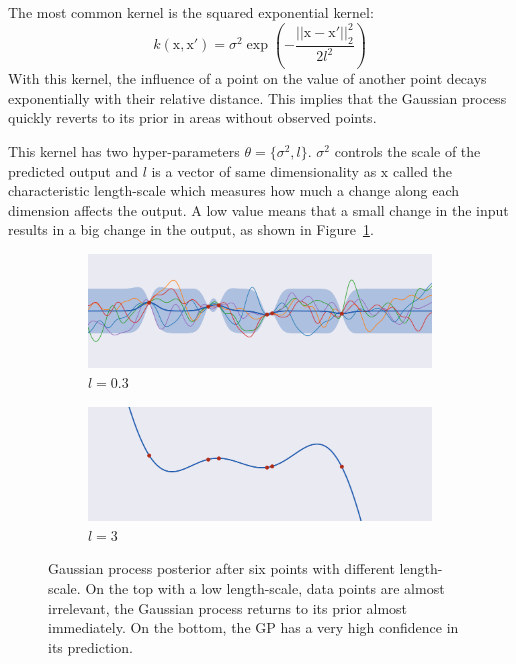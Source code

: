 The most common kernel is the squared exponential kernel:
\begin{equation}
	k(\mathrm{x}, \mathrm{x'}) = \sigma^2 \exp\left( -\frac{||\mathrm{x} - \mathrm{x'}||_2^2}{2l^2}\right)
	\label{eq:sqexp}
\end{equation}
With this kernel, the influence of a point on the value of another point decays exponentially with their relative distance. This implies that the Gaussian process quickly reverts to its prior in areas without observed points.

This kernel has two hyper-parameters $\theta = \{ \sigma^2 , l \}$. $\sigma^2$ controls the scale of the predicted output and $l$ is a vector of same dimensionality as $\mathrm{x}$ called the characteristic length-scale which measures how much a change along each dimension affects the output. A low value means that a small change in the input results in a big change in the output, as shown in Figure~\ref{fig:gp_lengthscale}. 

\begin{figure}[htb]
    \centering
    \begin{subfigure}[b]{\textwidth}
        \includegraphics[width=\textwidth]{img_hyperopt/gp_lengthscale_small}
        \caption{$l = 0.3$}
    \end{subfigure}

    \begin{subfigure}[b]{\textwidth}
        \includegraphics[width=\textwidth]{img_hyperopt/gp_lengthscale_big}
        \caption{$l = 3$}
    \end{subfigure}
    \caption[Gaussian process posterior with different length-scale]{Gaussian process posterior after six points with different length-scale. On the top with a low length-scale, data points are almost irrelevant, the Gaussian process returns to its prior almost immediately. On the bottom, the GP has a very high confidence in its prediction.}
    \label{fig:gp_lengthscale}
\end{figure}


